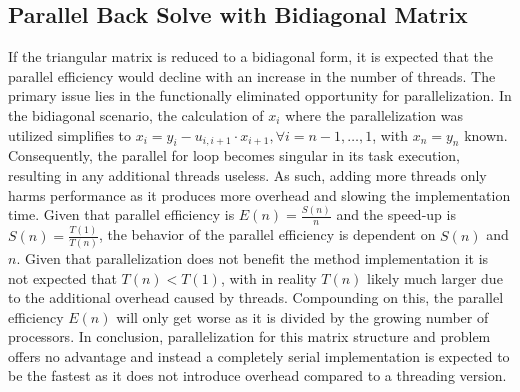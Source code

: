 \documentclass{article}
\begin{document}
\subsection{Parallel Back Solve with Bidiagonal Matrix}
If the triangular matrix is reduced to a bidiagonal form, it is expected that the parallel efficiency would decline with an increase in the number of threads. The primary issue lies in the functionally eliminated opportunity for parallelization. In the bidiagonal scenario, the calculation of $x_{i}$ where the parallelization was utilized simplifies to $x_{i} = y_{i} - u_{i,i+1} \cdot x_{i+1}, \forall i = n-1, \ldots, 1$, with $x_{n} = y_{n}$ known. Consequently, the parallel for loop becomes singular in its task execution, resulting in any additional threads useless. As such, adding more threads only harms performance as it produces more overhead and slowing the implementation time. Given that parallel efficiency is $E(n) = \frac{S(n)}{n}$ and the speed-up is $S(n) = \frac{T(1)}{T(n)}$, the behavior of the parallel efficiency is dependent on $S(n)$ and $n$. Given that parallelization does not benefit the method implementation it is not expected that $T(n) < T(1)$, with in reality $T(n)$ likely much larger due to the additional overhead caused by threads. Compounding on this, the parallel efficiency $E(n)$ will only get worse as it is divided by the growing number of processors. In conclusion, parallelization for this matrix structure and problem offers no advantage and instead a completely serial implementation is expected to be the fastest as it does not introduce overhead compared to a threading version.
\end{document}
